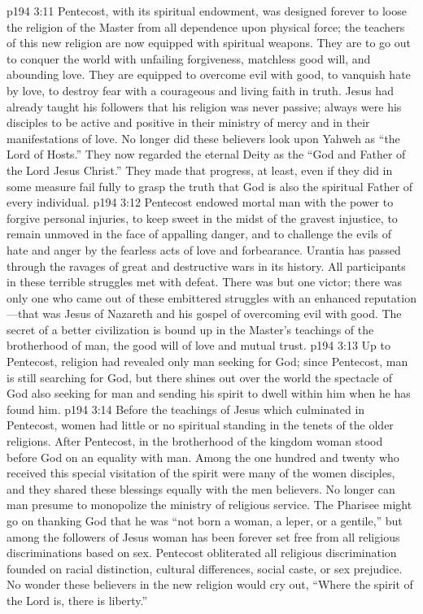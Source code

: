 \pc \vs p194 3:11 Pentecost, with its spiritual endowment, was designed forever to loose the religion of the Master from all dependence upon physical force; the teachers of this new religion are now equipped with spiritual weapons. They are to go out to conquer the world with unfailing forgiveness, matchless good will, and abounding love. They are equipped to overcome evil with good, to vanquish hate by love, to destroy fear with a courageous and living faith in truth. Jesus had already taught his followers that his religion was never passive; always were his disciples to be active and positive in their ministry of mercy and in their manifestations of love. No longer did these believers look upon Yahweh as “the Lord of Hosts.” They now regarded the eternal Deity as the “God and Father of the Lord Jesus Christ.” They made that progress, at least, even if they did in some measure fail fully to grasp the truth that God is also the spiritual Father of every individual.
\vs p194 3:12 Pentecost endowed mortal man with the power to forgive personal injuries, to keep sweet in the midst of the gravest injustice, to remain unmoved in the face of appalling danger, and to challenge the evils of hate and anger by the fearless acts of love and forbearance. Urantia has passed through the ravages of great and destructive wars in its history. All participants in these terrible struggles met with defeat. There was but one victor; there was only one who came out of these embittered struggles with an enhanced reputation---that was Jesus of Nazareth and his gospel of overcoming evil with good. The secret of a better civilization is bound up in the Master’s teachings of the brotherhood of man, the good will of love and mutual trust.
\vs p194 3:13 Up to Pentecost, religion had revealed only man seeking for God; since Pentecost, man is still searching for God, but there shines out over the world the spectacle of God also seeking for man and sending his spirit to dwell within him when he has found him.
\pc \vs p194 3:14 Before the teachings of Jesus which culminated in Pentecost, women had little or no spiritual standing in the tenets of the older religions. After Pentecost, in the brotherhood of the kingdom woman stood before God on an equality with man. Among the one hundred and twenty who received this special visitation of the spirit were many of the women disciples, and they shared these blessings equally with the men believers. No longer can man presume to monopolize the ministry of religious service. The Pharisee might go on thanking God that he was “not born a woman, a leper, or a gentile,” but among the followers of Jesus woman has been forever set free from all religious discriminations based on sex. Pentecost obliterated all religious discrimination founded on racial distinction, cultural differences, social caste, or sex prejudice. No wonder these believers in the new religion would cry out, “Where the spirit of the Lord is, there is liberty.”
